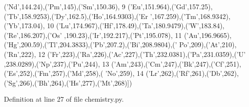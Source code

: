\begin{DoxyCode}
      (\textcolor{stringliteral}{'Nd'},144.24),(\textcolor{stringliteral}{'Pm'},145),(\textcolor{stringliteral}{'Sm'},150.36),
9                              (\textcolor{stringliteral}{'Eu'},151.964),(\textcolor{stringliteral}{'Gd'},157.25),(\textcolor{stringliteral}{'Tb'},158.9253),(\textcolor{stringliteral}{'Dy'},162.5),(\textcolor{stringliteral}{'Ho'},164.9303),(\textcolor{stringliteral}{'Er
      '},167.259),(\textcolor{stringliteral}{'Tm'},168.9342),(\textcolor{stringliteral}{'Yb'},173.04),
10                              (\textcolor{stringliteral}{'Lu'},174.967),(\textcolor{stringliteral}{'Hf'},178.49),(\textcolor{stringliteral}{'Ta'},180.9479),(\textcolor{stringliteral}{'W'},183.84),(\textcolor{stringliteral}{'Re'},186.207),(\textcolor{stringliteral}{'Os'}
      ,190.23),(\textcolor{stringliteral}{'Ir'},192.217),(\textcolor{stringliteral}{'Pt'},195.078),
11                              (\textcolor{stringliteral}{'Au'},196.9665),(\textcolor{stringliteral}{'Hg'},200.59),(\textcolor{stringliteral}{'Tl'},204.3833),(\textcolor{stringliteral}{'Pb'},207.2),(\textcolor{stringliteral}{'Bi'},208.9804),(\textcolor{stringliteral}{'
      Po'},209),(\textcolor{stringliteral}{'At'},210),(\textcolor{stringliteral}{'Rn'},222),
12                              (\textcolor{stringliteral}{'Fr'},223),(\textcolor{stringliteral}{'Ra'},226),(\textcolor{stringliteral}{'Ac'},227),(\textcolor{stringliteral}{'Th'},232.0381),(\textcolor{stringliteral}{'Pa'},231.0359),(\textcolor{stringliteral}{'U'
      ,238.0289),('}Np',237),('Pu',244),
13                              (\textcolor{stringliteral}{'Am'},243),(\textcolor{stringliteral}{'Cm'},247),(\textcolor{stringliteral}{'Bk'},247),(\textcolor{stringliteral}{'Cf'},251),(\textcolor{stringliteral}{'Es'},252),(\textcolor{stringliteral}{'Fm'},257),(\textcolor{stringliteral}{'Md'},258),(\textcolor{stringliteral}{
      'No'},259),
14                              (\textcolor{stringliteral}{'Lr'},262),(\textcolor{stringliteral}{'Rf'},261),(\textcolor{stringliteral}{'Db'},262),(\textcolor{stringliteral}{'Sg'},266),(\textcolor{stringliteral}{'Bh'},264),(\textcolor{stringliteral}{'Hs'},277),(\textcolor{stringliteral}{'Mt'},268)])
\end{DoxyCode}


Definition at line 27 of file chemistry.\+py.

\mbox{\label{namespacesrc_1_1chemistry_af96fd92a64526125e88e64389117ff77}} 

